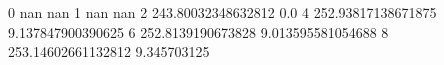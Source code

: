 0 nan nan
1 nan nan
2 243.80032348632812 0.0
4 252.93817138671875 9.137847900390625
6 252.8139190673828 9.013595581054688
8 253.14602661132812 9.345703125
